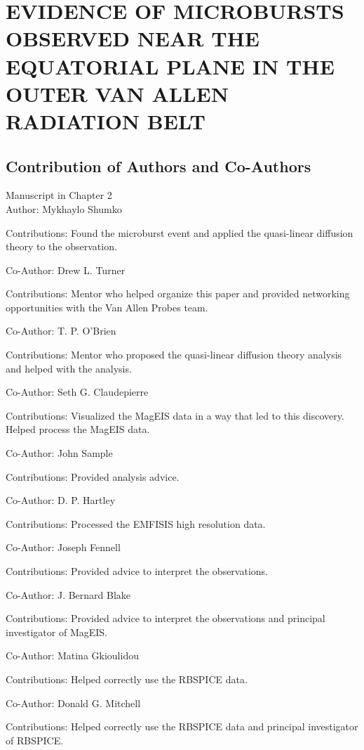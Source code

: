 \chapter{EVIDENCE OF MICROBURSTS OBSERVED NEAR THE EQUATORIAL PLANE IN THE OUTER VAN ALLEN RADIATION BELT}\label{CH:mageis_microburst}

\section{Contribution of Authors and Co-Authors} 
\noindent Manuscript in Chapter 2 \\ 

\noindent Author: Mykhaylo Shumko
\begin{singlespace} \noindent Contributions: Found the microburst event and applied the quasi-linear diffusion theory to the observation. \end{singlespace}
\noindent Co-Author:  Drew L. Turner 
\begin{singlespace} \noindent Contributions: Mentor who helped organize this paper and provided networking opportunities with the Van Allen Probes team. \end{singlespace}
\noindent Co-Author: T. P. O'Brien
\begin{singlespace} \noindent Contributions: Mentor who proposed the quasi-linear diffusion theory analysis and helped with the analysis. \end{singlespace}
\noindent Co-Author:  Seth G. Claudepierre
\begin{singlespace} \noindent Contributions: Visualized the MagEIS data in a way that led to this discovery. Helped process the MagEIS data. \end{singlespace}
\noindent Co-Author: John Sample
\begin{singlespace} \noindent Contributions: Provided analysis advice. \end{singlespace}
\noindent Co-Author: D. P. Hartley
\begin{singlespace} \noindent Contributions: Processed the EMFISIS high resolution data. \end{singlespace}
\noindent Co-Author: Joseph Fennell
\begin{singlespace} \noindent Contributions: Provided advice to interpret the observations.\end{singlespace}
\noindent Co-Author: J. Bernard Blake
\begin{singlespace} \noindent Contributions: Provided advice to interpret the observations and principal investigator of MagEIS. \end{singlespace}
\newpage
\noindent Co-Author: Matina Gkioulidou
\begin{singlespace} \noindent Contributions: Helped correctly use the RBSPICE data. \end{singlespace}
\noindent Co-Author: Donald G. Mitchell
\begin{singlespace} \noindent Contributions: Helped correctly use the RBSPICE data and principal investigator of RBSPICE. \end{singlespace}

